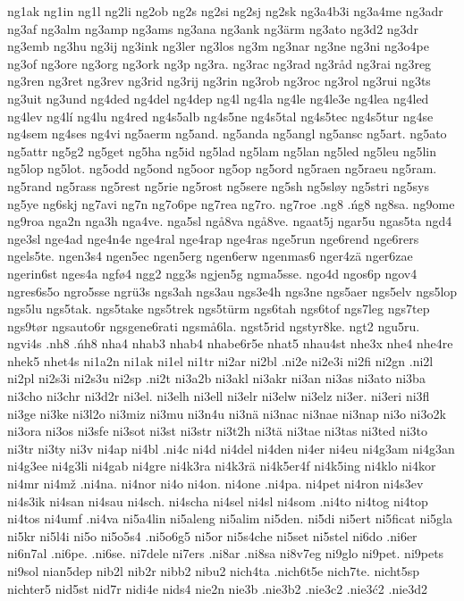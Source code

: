 {{ng1ak
ng1in
ng1l
ng2li
ng2ob
ng2s
ng2si
ng2sj
ng2sk
ng3a4b3i
ng3a4me
ng3adr
ng3af
ng3alm
ng3amp
ng3ams
ng3ana
ng3ank
ng3ärm
ng3ato
ng3d2
ng3dr
ng3emb
ng3hu
ng3ij
ng3ink
ng3ler
ng3los
ng3m
ng3nar
ng3ne
ng3ni
ng3o4pe
ng3of
ng3ore
ng3org
ng3ork
ng3p
ng3ra.
ng3rac
ng3rad
ng3råd
ng3rai
ng3reg
ng3ren
ng3ret
ng3rev
ng3rid
ng3rij
ng3rin
ng3rob
ng3roc
ng3rol
ng3rui
ng3ts
ng3uit
ng3und
ng4ded
ng4del
ng4dep
ng4l
ng4la
ng4le
ng4le3e
ng4lea
ng4led
ng4lev
ng4lí
ng4lu
ng4red
ng4s5alb
ng4s5ne
ng4s5tal
ng4s5tec
ng4s5tur
ng4se
ng4sem
ng4ses
ng4vi
ng5aerm
ng5and.
ng5anda
ng5angl
ng5ansc
ng5art.
ng5ato
ng5attr
ng5g2
ng5get
ng5ha
ng5id
ng5lad
ng5lam
ng5lan
ng5led
ng5leu
ng5lin
ng5lop
ng5lot.
ng5odd
ng5ond
ng5oor
ng5op
ng5ord
ng5raen
ng5raeu
ng5ram.
ng5rand
ng5rass
ng5rest
ng5rie
ng5rost
ng5sere
ng5sh
ng5sløy
ng5stri
ng5sys
ng5ye
ng6skj
ng7avi
ng7n
ng7o6pe
ng7rea
ng7ro.
ng7roe
.ng8
.ńg8
ng8sa.
ng9ome
ng9roa
nga2n
nga3h
nga4ve.
nga5sl
ngå8va
ngå8ve.
ngaat5j
ngar5u
ngas5ta
ngd4
nge3sl
nge4ad
nge4n4e
nge4ral
nge4rap
nge4ras
nge5run
nge6rend
nge6rers
ngels5te.
ngen3s4
ngen5ec
ngen5erg
ngen6erw
ngenmas6
nger4zä
nger6zae
ngerin6st
nges4a
ngfø4
ngg2
ngg3s
ngjen5g
ngma5sse.
ngo4d
ngos6p
ngov4
ngres6s5o
ngro5sse
ngrü3s
ngs3ah
ngs3au
ngs3e4h
ngs3ne
ngs5aer
ngs5elv
ngs5lop
ngs5lu
ngs5tak.
ngs5take
ngs5trek
ngs5türm
ngs6tah
ngs6tof
ngs7leg
ngs7tep
ngs9tør
ngsauto6r
ngsgene6rati
ngsmå6la.
ngst5rid
ngstyr8ke.
ngt2
ngu5ru.
ngvi4s
.nh8
.ńh8
nha4
nhab3
nhab4
nhabe6r5e
nhat5
nhau4st
nhe3x
nhe4
nhe4re
nhek5
nhet4s
ni1a2n
ni1ak
ni1el
ni1tr
ni2ar
ni2bl
.ni2e
ni2e3i
ni2fi
ni2gn
.ni2l
ni2pl
ni2s3i
ni2s3u
ni2sp
.ni2t
ni3a2b
ni3akl
ni3akr
ni3an
ni3as
ni3ato
ni3ba
ni3cho
ni3chr
ni3d2r
ni3el.
ni3elh
ni3ell
ni3elr
ni3elw
ni3elz
ni3er.
ni3eri
ni3fl
ni3ge
ni3ke
ni3l2o
ni3miz
ni3mu
ni3n4u
ni3nä
ni3nac
ni3nae
ni3nap
ni3o
ni3o2k
ni3ora
ni3os
ni3sfe
ni3sot
ni3st
ni3str
ni3t2h
ni3tä
ni3tae
ni3tas
ni3ted
ni3to
ni3tr
ni3ty
ni3v
ni4ap
ni4bl
.ni4c
ni4d
ni4del
ni4den
ni4er
ni4eu
ni4g3am
ni4g3an
ni4g3ee
ni4g3li
ni4gab
ni4gre
ni4k3ra
ni4k3rä
ni4k5er4f
ni4k5ing
ni4klo
ni4kor
ni4mr
ni4mž
.ni4na.
ni4nor
ni4o
ni4on.
ni4one
.ni4pa.
ni4pet
ni4ron
ni4s3ev
ni4s3ik
ni4san
ni4sau
ni4sch.
ni4scha
ni4sel
ni4sl
ni4som
.ni4to
ni4tog
ni4top
ni4tos
ni4umf
.ni4va
ni5a4lin
ni5aleng
ni5alim
ni5den.
ni5di
ni5ert
ni5ficat
ni5gla
ni5kr
ni5l4i
ni5o
ni5o5s4
.ni5o6g5
ni5or
ni5s4che
ni5set
ni5stel
ni6do
.ni6er
ni6n7al
.ni6pe.
.ni6se.
ni7dele
ni7ers
.ni8ar
.ni8sa
ni8v7eg
ni9glo
ni9pet.
ni9pets
ni9sol
nian5dep
nib2l
nib2r
nibb2
nibu2
nich4ta
.nich6t5e
nich7te.
nicht5sp
nichter5
nid5st
nid7r
nidi4e
nids4
nie2n
nie3b
.nie3b2
.nie3c2
.nie3ć2
.nie3d2
}}
